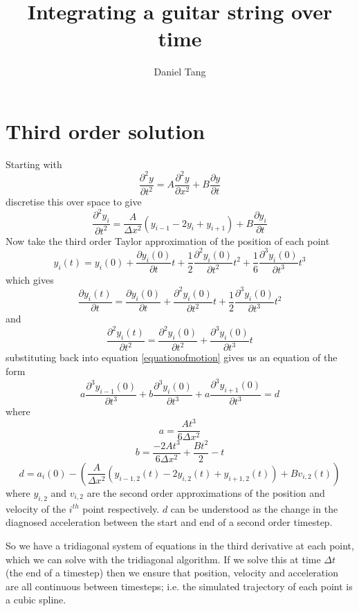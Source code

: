 \documentclass[a4paper]{article}
\title{Integrating a guitar string over time}
\author{Daniel Tang}
\begin{document}
\maketitle
\section{Third order solution}
Starting with
\[
\frac{\partial^2 y}{\partial t^2} = A\frac{\partial^2y}{\partial x^2} + B \frac{\partial y}{\partial t}
\]
discretise this over space to give
\begin{equation}
\frac{\partial^2 y_i}{\partial t^2} = \frac{A}{\Delta x^2}(y_{i-1} - 2y_i + y_{i+1}) + B \frac{\partial y_i}{\partial t}
\label{equationofmotion}
\end{equation}
Now take the third order Taylor approximation of the position of each point
\[
y_i(t) = y_i(0) + \frac{\partial y_i(0)}{\partial t}t + \frac{1}{2}\frac{\partial^2 y_i(0)}{\partial t^2}t^2 + \frac{1}{6}\frac{\partial^3 y_i(0)}{\partial t^3}t^3
\]
which gives
\[
\frac{\partial y_i(t)}{\partial t} = \frac{\partial y_i(0)}{\partial t} + \frac{\partial^2 y_i(0)}{\partial t^2}t + \frac{1}{2}\frac{\partial^3 y_i(0)}{\partial t^3}t^2
\]
and
\[
\frac{\partial^2 y_i(t)}{\partial t^2} = \frac{\partial^2 y_i(0)}{\partial t^2} + \frac{\partial^3 y_i(0)}{\partial t^3}t
\]
substituting back into equation \ref{equationofmotion} gives us an equation of the form
\[
a\frac{\partial^3 y_{i-1}(0)}{\partial t^3} + b\frac{\partial^3 y_i(0)}{\partial t^3} + a\frac{\partial^3 y_{i+1}(0)}{\partial t^3} = d
\]
where
\[
a = \frac{At^3}{6\Delta x^2}
\]
\[
b = \frac{-2At^3}{6\Delta x^2} + \frac{Bt^2}{2} - t
\]
\[
d = a_i(0) - \left(\frac{A}{\Delta x^2}(y_{i-1,2}(t) - 2y_{i,2}(t) + y_{i+1,2}(t)) + Bv_{i,2}(t)\right)
\]
where $y_{i,2}$ and $v_{i,2}$ are the second order approximations of the position and velocity of the $i^{th}$ point respectively. $d$ can be understood as the change in the diagnosed acceleration between the start and end of a second order timestep. 

So we have a tridiagonal system of equations in the third derivative at each point, which we can solve with the tridiagonal algorithm. If we solve this at time $\Delta t$ (the end of a timestep) then we ensure that position, velocity and acceleration are all continuous between timesteps; i.e. the simulated trajectory of each point is a cubic spline.


\end{document}
